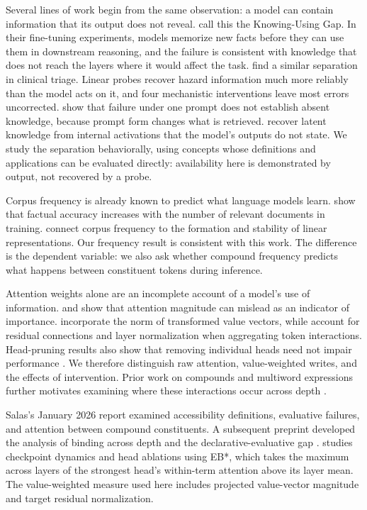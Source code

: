 \documentclass[
  english,
]{article}
\begin{document}
Several lines of work begin from the same observation: a model can contain information that its output does not reveal. \citet{dai2026towards} call this the Knowing-Using Gap. In their fine-tuning experiments, models memorize new facts before they can use them in downstream reasoning, and the failure is consistent with knowledge that does not reach the layers where it would affect the task. \citet{basu2026interpretability} find a similar separation in clinical triage. Linear probes recover hazard information much more reliably than the model acts on it, and four mechanistic interventions leave most errors uncorrected. \citet{jiang2020how} show that failure under one prompt does not establish absent knowledge, because prompt form changes what is retrieved. \citet{burns2023discovering} recover latent knowledge from internal activations that the model's outputs do not state. We study the separation behaviorally, using concepts whose definitions and applications can be evaluated directly: availability here is demonstrated by output, not recovered by a probe.

Corpus frequency is already known to predict what language models learn. \citet{kandpal2023large} show that factual accuracy increases with the number of relevant documents in training. \citet{merullo2024mutual} connect corpus frequency to the formation and stability of linear representations. Our frequency result is consistent with this work. The difference is the dependent variable: we also ask whether compound frequency predicts what happens between constituent tokens during inference.

Attention weights alone are an incomplete account of a model's use of information. \citet{jain2019attention} and \citet{serrano2019attention} show that attention magnitude can mislead as an indicator of importance. \citet{kobayashi2020attention} incorporate the norm of transformed value vectors, while \citet{ferrando2022mixing} account for residual connections and layer normalization when aggregating token interactions. Head-pruning results also show that removing individual heads need not impair performance \citep{michel2019sixteen}. We therefore distinguish raw attention, value-weighted writes, and the effects of intervention. Prior work on compounds and multiword expressions further motivates examining where these interactions occur across depth \citep{miletic2023systematic, miletic2024semantics, vig2019analyzing}.

Salas's January 2026 report \citep{salas2026testing} examined accessibility definitions, evaluative failures, and attention between compound constituents. A subsequent preprint developed the analysis of binding across depth and the declarative-evaluative gap \citep{salas2026emergence}. \citet{tran2026attention} studies checkpoint dynamics and head ablations using EB*, which takes the maximum across layers of the strongest head's within-term attention above its layer mean. The value-weighted measure used here includes projected value-vector magnitude and target residual normalization.
\end{document}
